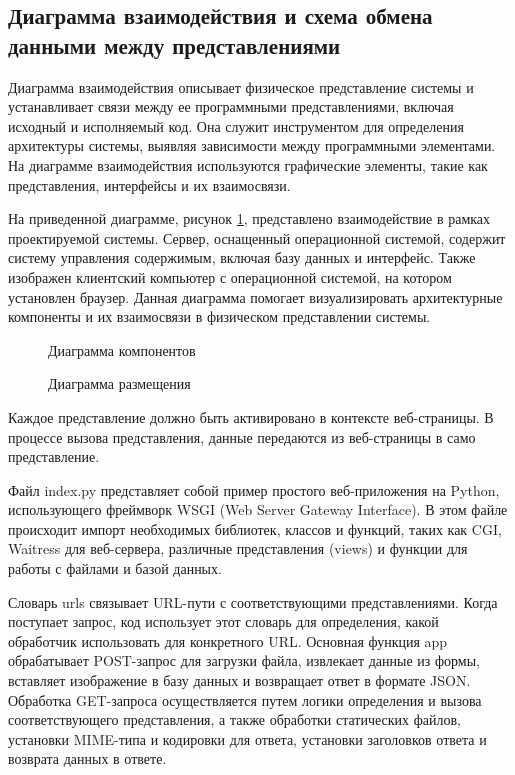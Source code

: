 \subsection{Диаграмма взаимодействия и схема обмена данными между представлениями}

Диаграмма взаимодействия описывает физическое представление системы и устанавливает связи между ее программными представлениями, включая исходный и исполняемый код. Она служит инструментом для определения архитектуры системы, выявляя зависимости между программными элементами. На диаграмме взаимодействия используются графические элементы, такие как представления, интерфейсы и их взаимосвязи.

На приведенной диаграмме, рисунок \ref{comp:image}, представлено взаимодействие в рамках проектируемой системы. Сервер, оснащенный операционной системой, содержит систему управления содержимым, включая базу данных и интерфейс. Также изображен клиентский компьютер с операционной системой, на котором установлен браузер. Данная диаграмма помогает визуализировать архитектурные компоненты и их взаимосвязи в физическом представлении системы.


\begin{figure}[ht]
\caption{Диаграмма компонентов}
\label{comp:image}
\end{figure}

\vspace{+13mm} %
\begin{figure}[ht]
	\caption{Диаграмма размещения}
	\label{place:image}
\end{figure}

Каждое представление должно быть активировано в контексте веб-страницы. В процессе вызова представления, данные передаются из веб-страницы в само представление.

Файл index.py представляет собой пример простого веб-приложения на Python, использующего фреймворк WSGI (Web Server Gateway Interface). В этом файле происходит импорт необходимых библиотек, классов и функций, таких как CGI, Waitress для веб-сервера, различные представления (views) и функции для работы с файлами и базой данных.



Словарь urls связывает URL-пути с соответствующими представлениями. Когда поступает запрос, код использует этот словарь для определения, какой обработчик использовать для конкретного URL. Основная функция app обрабатывает POST-запрос для загрузки файла, извлекает данные из формы, вставляет изображение в базу данных и возвращает ответ в формате JSON. Обработка GET-запроса осуществляется путем логики определения и вызова соответствующего представления, а также обработки статических файлов, установки MIME-типа и кодировки для ответа, установки заголовков ответа и возврата данных в ответе.

